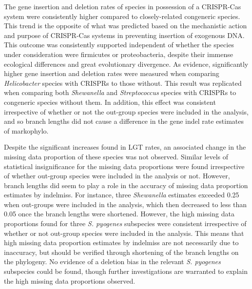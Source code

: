 \documentclass[english]{article}
\begin{document}
The gene insertion and deletion rates of species in possession of a
CRISPR-Cas system were consistently higher compared to closely-related
congeneric species. This trend is the opposite of what was predicted
based on the mechanistic action and purpose of CRISPR-Cas systems in
preventing insertion of exogenous DNA. This outcome was consistently
supported independent of whether the species under consideration were
firmicutes or proteobacteria, despite their immense ecological
differences and great evolutionary divergence. As evidence,
significantly higher gene insertion and deletion rates were measured
when comparing \textit{Helicobacter} species with CRISPRs to those without.
This result was replicated when comparing both \textit{Shewanella} and
\textit{Streptococcus} species with CRISPRs to congeneric species 
without them.
In addition, this effect was consistent irrespective of whether or not the
out-group species were included in the analysis, and so branch lengths
did not cause a difference in the gene 
indel rate estimates of markophylo.   

Despite the significant increases found in LGT rates, an
associated change in the missing data proportion of these species was
not observed. Similar levels of statistical insignificance for the
missing data proportions were found irrespective of whether out-group
species were included in the analysis or not. However, branch lengths
did seem to play a role in the accuracy of missing data proportion
estimates by indelmiss. For instance, three \textit{Shewanella} estimates
exceeded 0.25 when out-groups were included in the analysis, which
then decreased to less than 0.05 once the branch lengths were
shortened. However, the high missing data proportions found for three
\textit{S. pyogenes} 
subspecies were consistent irrespective of whether or not
out-group species were included in the analysis.  This means that high
missing data proportion estimates by indelmiss are not necessarily due
to inaccuracy, but should be verified through shortening of the branch
lengths on the phylogeny. No evidence of a deletion bias in the
relevant \textit{S. pyogenes} subspecies could be found, though further
investigations are warranted to explain the high missing data
proportions observed. 
\end{document}
